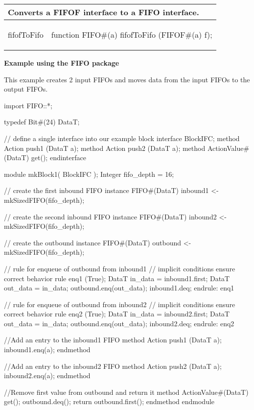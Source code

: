 \begin{center}
\begin{tabular}{|p{1.1 in}|p{4.4 in}|}
\hline
\multicolumn{2}{|l|}{Converts a FIFOF interface to a FIFO interface.}\\
\hline
\begin{libverbatim}fifofToFifo
\end{libverbatim}
& \begin{libverbatim}
function FIFO#(a) fifofToFifo (FIFOF#(a) f);
\end{libverbatim}
\\
\hline
\end{tabular}
\end{center}



{\bf Example using the FIFO package}

This example creates 2 input FIFOs and moves data from the input FIFOs
to the output FIFOs.

\begin{libverbatim}
   import FIFO::*;

   typedef Bit#(24) DataT;

   // define a single interface into our example block
   interface BlockIFC;
      method Action push1 (DataT a);
      method Action push2 (DataT a);
      method ActionValue#(DataT) get();
   endinterface 
   
   module mkBlock1( BlockIFC  );
      Integer fifo_depth = 16;

      // create the first inbound FIFO instance 
      FIFO#(DataT) inbound1 <- mkSizedFIFO(fifo_depth);

      // create the second inbound FIFO instance 
      FIFO#(DataT) inbound2 <- mkSizedFIFO(fifo_depth);
    
      // create the outbound instance
      FIFO#(DataT) outbound <- mkSizedFIFO(fifo_depth);
 
      // rule for enqueue of outbound from inbound1
      // implicit conditions ensure correct behavior
      rule enq1 (True);
         DataT in_data = inbound1.first;
         DataT out_data = in_data;
         outbound.enq(out_data); 
         inbound1.deq; 
      endrule: enq1
    
      // rule for enqueue of outbound from inbound2
      // implicit conditions ensure correct behavior
      rule enq2 (True);
         DataT in_data = inbound2.first;
         DataT out_data = in_data;
         outbound.enq(out_data); 
         inbound2.deq; 
      endrule: enq2

      //Add an entry  to the inbound1 FIFO
      method Action push1 (DataT a); 
            inbound1.enq(a);
      endmethod

      //Add an entry  to the inbound2 FIFO
      method Action push2 (DataT a); 
            inbound2.enq(a);
      endmethod
 
      //Remove first value from outbound and return it
      method ActionValue#(DataT) get(); 
            outbound.deq();
            return outbound.first();
      endmethod
   endmodule
\end{libverbatim}

